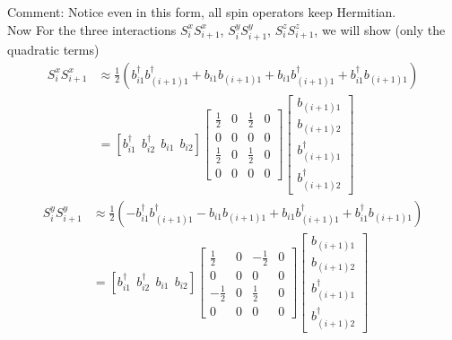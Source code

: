 \documentclass[letter]{article}
\begin{document}
\indent Comment: Notice even in this form, all spin operators keep Hermitian.\\
\indent Now For the three interactions $S_{i}^x S_{i+1}^x$, $S_{i}^y S_{i+1}^y$, $S_{i}^z S_{i+1}^z$, we will show (only the quadratic terms)
$$
\begin{aligned}
    S_{i}^x S_{i+1}^x &\approx\frac{1}{2}\left(b_{i1}^{\dagger}b_{(i+1)1}^{\dagger}+b_{i1}b_{(i+1)1}+b_{i1}b_{(i+1)1}^{\dagger}+b_{i1}^{\dagger}b_{(i+1)1}\right)\\ &=\left[
        b_{i1}^{\dagger} \ \ 
        b_{i2}^{\dagger}\  \ 
        b_{i1}\ \ 
        b_{i2}\right]
       \begin{bmatrix}
            \frac{1}{2} & 0 & \frac{1}{2} & 0 \\
           0 &  0 & 0 &0 \\
           \frac{1}{2} &  0 & \frac{1}{2} &0\\
            0 & 0 & 0& 0
            \end{bmatrix}\begin{bmatrix}
                b_{(i+1)1}  \\
                b_{(i+1)2}  \\
                b_{(i+1)1}^{\dagger}\\
                b_{(i+1)2}^{\dagger}
                \end{bmatrix}
\end{aligned}
$$
$$
\begin{aligned}
    S_{i}^y S_{i+1}^y &\approx\frac{1}{2}\left(-b_{i1}^{\dagger}b_{(i+1)1}^{\dagger}-b_{i1}b_{(i+1)1}+b_{i1}b_{(i+1)1}^{\dagger}+b_{i1}^{\dagger}b_{(i+1)1}\right)\\ &=\left[
        b_{i1}^{\dagger} \ \ 
        b_{i2}^{\dagger}\  \ 
        b_{i1}\ \ 
        b_{i2}\right]
        \begin{bmatrix}
            \frac{1}{2} & 0 & -\frac{1}{2} & 0 \\
           0 &  0 & 0 &0 \\
           -\frac{1}{2} &  0 & \frac{1}{2} &0\\
            0 & 0 & 0& 0
            \end{bmatrix}\begin{bmatrix}
                b_{(i+1)1}  \\
                b_{(i+1)2}  \\
                b_{(i+1)1}^{\dagger}\\
                b_{(i+1)2}^{\dagger}
                \end{bmatrix}
\end{aligned}
$$
\end{document}
